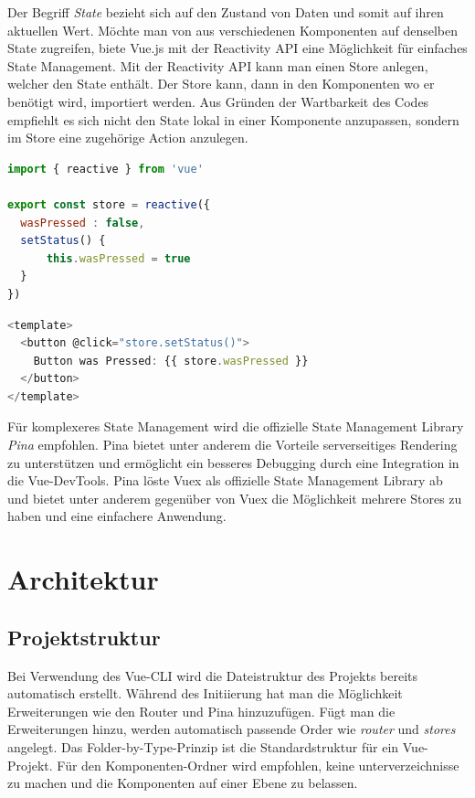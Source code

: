 Der Begriff \emph{State} bezieht sich auf den Zustand von Daten und somit auf ihren aktuellen Wert.
Möchte man von aus verschiedenen Komponenten auf denselben State zugreifen,
biete Vue.js mit der Reactivity API eine Möglichkeit für einfaches State Management.
Mit der Reactivity API kann man einen Store anlegen, welcher den State enthält.
Der Store kann, dann in den Komponenten wo er benötigt wird, importiert werden.
Aus Gründen der Wartbarkeit des Codes empfiehlt es sich nicht den State lokal in einer Komponente anzupassen,
sondern im Store eine zugehörige Action anzulegen. \cite{vueStateManagement}

\begin{lstlisting}[caption={Anlegen eines Stores mit Reactivity API},language=javascript,label={lst:Anlegen-Store}]
import { reactive } from 'vue'

export const store = reactive({
  wasPressed : false,
  setStatus() {
      this.wasPressed = true
  }
})
\end{lstlisting}

\begin{lstlisting}[caption={Vewendung des Stores},language=javascript,label={lst:Verwendung-Store}]
<template>
  <button @click="store.setStatus()">
    Button was Pressed: {{ store.wasPressed }}
  </button>
</template>
\end{lstlisting}

Für komplexeres State Management wird die offizielle State Management Library \emph{Pina} empfohlen.
Pina bietet unter anderem die Vorteile serverseitiges Rendering zu unterstützen und
ermöglicht ein besseres Debugging durch eine Integration in die Vue-DevTools.
Pina löste Vuex als offizielle State Management Library ab und bietet unter anderem gegenüber von Vuex
die Möglichkeit mehrere Stores zu haben und eine einfachere Anwendung.  \cite{vueStateManagement}

\section{Architektur}

\subsection*{Projektstruktur}
Bei Verwendung des Vue-CLI wird die Dateistruktur des Projekts bereits automatisch erstellt.
Während des Initiierung hat man die Möglichkeit Erweiterungen wie den Router und Pina hinzuzufügen.
Fügt man die Erweiterungen hinzu, werden automatisch passende Order wie \emph{router} und \emph{stores} angelegt.
Das Folder-by-Type-Prinzip ist die Standardstruktur für ein Vue-Projekt.
Für den Komponenten-Ordner wird empfohlen, keine unterverzeichnisse zu machen und
die Komponenten auf einer Ebene zu belassen. \cite{largeScaleVue}

